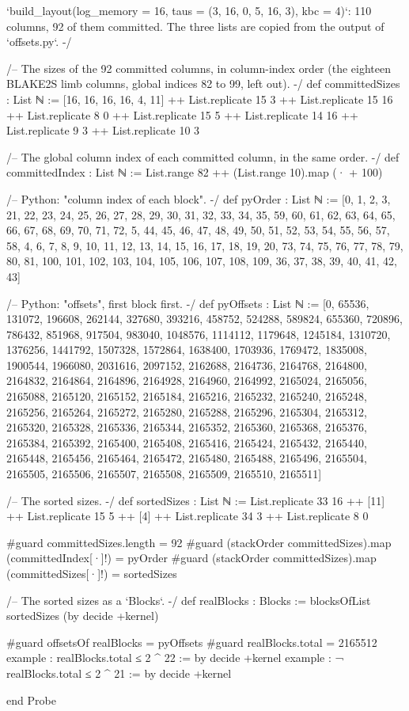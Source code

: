 \begin{leancode}
`build_layout(log_memory = 16, taus = (3, 16, 0, 5, 16, 3), kbc = 4)`: 110 columns, 92 of
them committed. The three lists are copied from the output of `offsets.py`. -/

/-- The sizes of the 92 committed columns, in column-index order (the eighteen BLAKE2S limb
columns, global indices 82 to 99, left out). -/
def committedSizes : List ℕ :=
  [16, 16, 16, 16, 4, 11] ++ List.replicate 15 3 ++ List.replicate 15 16 ++
    List.replicate 8 0 ++ List.replicate 15 5 ++ List.replicate 14 16 ++
    List.replicate 9 3 ++ List.replicate 10 3

/-- The global column index of each committed column, in the same order. -/
def committedIndex : List ℕ := List.range 82 ++ (List.range 10).map (· + 100)

/-- Python: "column index of each block". -/
def pyOrder : List ℕ :=
  [0, 1, 2, 3, 21, 22, 23, 24, 25, 26, 27, 28, 29, 30, 31, 32, 33, 34, 35, 59, 60, 61, 62, 63,
   64, 65, 66, 67, 68, 69, 70, 71, 72, 5, 44, 45, 46, 47, 48, 49, 50, 51, 52, 53, 54, 55, 56,
   57, 58, 4, 6, 7, 8, 9, 10, 11, 12, 13, 14, 15, 16, 17, 18, 19, 20, 73, 74, 75, 76, 77, 78,
   79, 80, 81, 100, 101, 102, 103, 104, 105, 106, 107, 108, 109, 36, 37, 38, 39, 40, 41, 42, 43]

/-- Python: "offsets", first block first. -/
def pyOffsets : List ℕ :=
  [0, 65536, 131072, 196608, 262144, 327680, 393216, 458752, 524288, 589824, 655360, 720896,
   786432, 851968, 917504, 983040, 1048576, 1114112, 1179648, 1245184, 1310720, 1376256,
   1441792, 1507328, 1572864, 1638400, 1703936, 1769472, 1835008, 1900544, 1966080, 2031616,
   2097152, 2162688, 2164736, 2164768, 2164800, 2164832, 2164864, 2164896, 2164928, 2164960,
   2164992, 2165024, 2165056, 2165088, 2165120, 2165152, 2165184, 2165216, 2165232, 2165240,
   2165248, 2165256, 2165264, 2165272, 2165280, 2165288, 2165296, 2165304, 2165312, 2165320,
   2165328, 2165336, 2165344, 2165352, 2165360, 2165368, 2165376, 2165384, 2165392, 2165400,
   2165408, 2165416, 2165424, 2165432, 2165440, 2165448, 2165456, 2165464, 2165472, 2165480,
   2165488, 2165496, 2165504, 2165505, 2165506, 2165507, 2165508, 2165509, 2165510, 2165511]

/-- The sorted sizes. -/
def sortedSizes : List ℕ :=
  List.replicate 33 16 ++ [11] ++ List.replicate 15 5 ++ [4] ++ List.replicate 34 3 ++
    List.replicate 8 0

#guard committedSizes.length = 92
#guard (stackOrder committedSizes).map (committedIndex[·]!) = pyOrder
#guard (stackOrder committedSizes).map (committedSizes[·]!) = sortedSizes

/-- The sorted sizes as a `Blocks`. -/
def realBlocks : Blocks := blocksOfList sortedSizes (by decide +kernel)

#guard offsetsOf realBlocks = pyOffsets
#guard realBlocks.total = 2165512
example : realBlocks.total ≤ 2 ^ 22 := by decide +kernel
example : ¬ realBlocks.total ≤ 2 ^ 21 := by decide +kernel

end Probe
\end{leancode}

